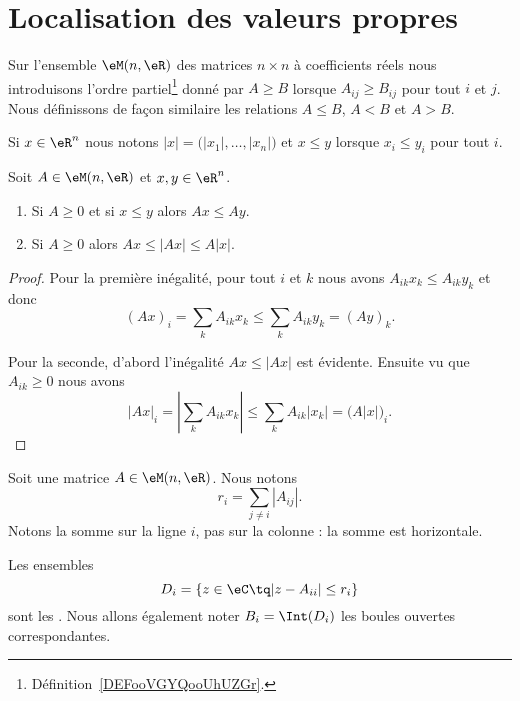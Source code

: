 \section{Localisation des valeurs propres}

Sur l'ensemble \( \eM(n,\eR)\) des matrices \( n\times n\) à coefficients réels nous introduisons l'ordre partiel\footnote{Définition~\ref{DEFooVGYQooUhUZGr}.} donné par \( A\geq B\) lorsque \( A_{ij}\geq B_{ij}\) pour tout \( i\) et \( j\). Nous définissons de façon similaire les relations \( A\leq B\), \( A<B\) et \( A>B\).

Si \( x\in \eR^n\) nous notons \( | x |=\big( | x_1 |,\ldots, | x_n | \big)\) et \( x\leq y\) lorsque \( x_i\leq y_i\) pour tout \( i\).

\begin{proposition}     \label{PROPooGVRVooZEvKcn}
	Soit \( A\in \eM(n,\eR)\) et \( x,y\in \eR^n\).
	\begin{enumerate}
		\item       \label{ITEMooXQOPooPVLjFh}
		      Si \( A\geq 0\) et si \( x\leq y\) alors \( Ax\leq Ay\).
		\item       \label{ITEMooQLCJooKIbws}
		      Si \( A\geq 0\) alors \( Ax\leq | Ax |\leq A| x |\).
	\end{enumerate}
\end{proposition}

\begin{proof}
	Pour la première inégalité, pour tout \( i\) et \( k\) nous avons \( A_{ik}x_k\leq A_{ik}y_k\) et donc
	\begin{equation}
		(Ax)_i=\sum_kA_{ik}x_k\leq \sum_kA_{ik}y_k=(Ay)_k.
	\end{equation}

	Pour la seconde, d'abord l'inégalité \( Ax\leq | Ax |\) est évidente. Ensuite vu que \( A_{ik}\geq 0\) nous avons
	\begin{equation}
		| Ax |_i=| \sum_kA_{ik}x_k |\leq \sum_kA_{ik}| x_k |=\big( A| x | \big)_i.
	\end{equation}
\end{proof}

Soit une matrice \( A\in\eM(n,\eR)\). Nous notons
\begin{equation}
	r_i=\sum_{j\neq i}| A_{ij} |.
\end{equation}
Notons la somme sur la ligne \( i\), pas sur la colonne : la somme est horizontale.
\begin{definition}
	Les ensembles
	\begin{equation}
		D_i=\{ z\in \eC\tq | z-A_{ii} |\leq r_i \}
	\end{equation}
	sont les . Nous allons également noter \( B_i=\Int(D_i)\) les boules ouvertes correspondantes.
\end{definition}

